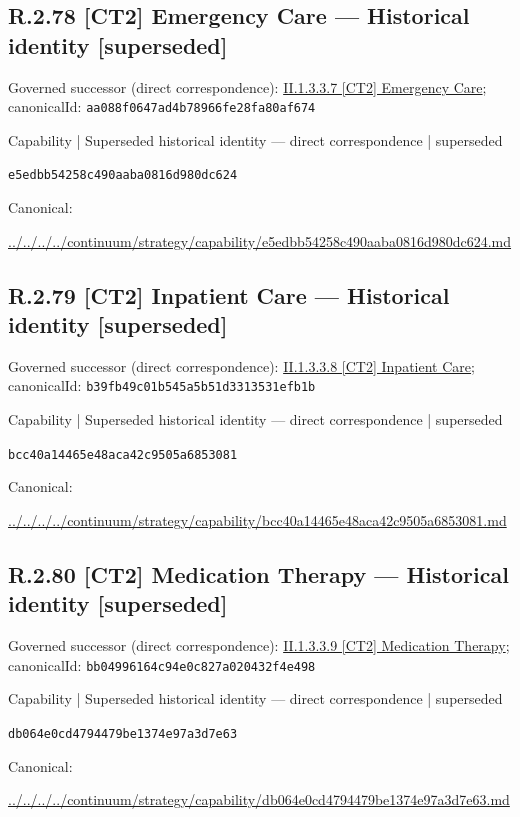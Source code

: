 \documentclass[10pt,a4paper]{article}
\begin{document}
\subsection*{R.2.78 [CT2] Emergency Care — Historical identity [superseded]}
Governed successor (direct correspondence): \hyperref[element-aa088f0647ad4b78966fe28fa80af674]{II.1.3.3.7 [CT2] Emergency Care}; canonicalId: \texttt{aa088f0647ad4b78966fe28fa80af674}\par
\label{element-e5edbb54258c490aaba0816d980dc624}
{\small Capability | Superseded historical identity — direct correspondence | superseded}\par
\texttt{e5edbb54258c490aaba0816d980dc624}\par
Canonical: \par
{\footnotesize\url{../../../../continuum/strategy/capability/e5edbb54258c490aaba0816d980dc624.md}}\par
\subsection*{R.2.79 [CT2] Inpatient Care — Historical identity [superseded]}
Governed successor (direct correspondence): \hyperref[element-b39fb49c01b545a5b51d3313531efb1b]{II.1.3.3.8 [CT2] Inpatient Care}; canonicalId: \texttt{b39fb49c01b545a5b51d3313531efb1b}\par
\label{element-bcc40a14465e48aca42c9505a6853081}
{\small Capability | Superseded historical identity — direct correspondence | superseded}\par
\texttt{bcc40a14465e48aca42c9505a6853081}\par
Canonical: \par
{\footnotesize\url{../../../../continuum/strategy/capability/bcc40a14465e48aca42c9505a6853081.md}}\par
\subsection*{R.2.80 [CT2] Medication Therapy — Historical identity [superseded]}
Governed successor (direct correspondence): \hyperref[element-bb04996164c94e0c827a020432f4e498]{II.1.3.3.9 [CT2] Medication Therapy}; canonicalId: \texttt{bb04996164c94e0c827a020432f4e498}\par
\label{element-db064e0cd4794479be1374e97a3d7e63}
{\small Capability | Superseded historical identity — direct correspondence | superseded}\par
\texttt{db064e0cd4794479be1374e97a3d7e63}\par
Canonical: \par
{\footnotesize\url{../../../../continuum/strategy/capability/db064e0cd4794479be1374e97a3d7e63.md}}\par
\end{document}
